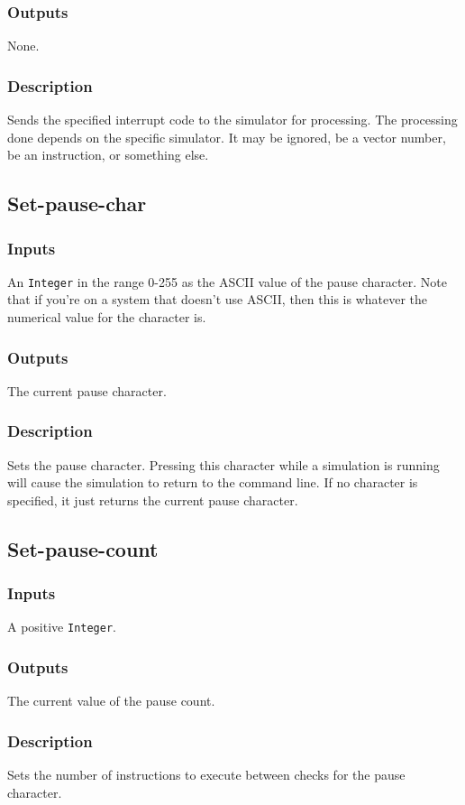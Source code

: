 \documentclass[10pt, openany]{book}
\newcommand{\datatype}[1]{\texttt{#1}}
\begin{document}
\subsubsection{Outputs}
None.
\subsubsection{Description}
Sends the specified interrupt code to the simulator for processing.
The processing done depends on the specific simulator.
It may be ignored, be a vector number, be an instruction, or something else.

\subsection{Set-pause-char}
\subsubsection{Inputs}
An \datatype{Integer} in the range 0-255 as the ASCII value of the pause character.
Note that if you're on a system that doesn't use ASCII, then this is whatever the numerical value for the character is.
\subsubsection{Outputs}
The current pause character.
\subsubsection{Description}
Sets the pause character.
Pressing this character while a simulation is running will cause the simulation to return to the command line.
If no character is specified, it just returns the current pause character.

\subsection{Set-pause-count}
\subsubsection{Inputs}
A positive \datatype{Integer}.
\subsubsection{Outputs}
The current value of the pause count.
\subsubsection{Description}
Sets the number of instructions to execute between checks for the pause character.
\end{document}
